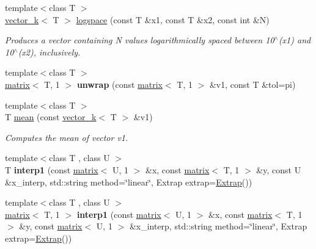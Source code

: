 \begin{DoxyCompactItemize}
\item 
{\footnotesize template$<$class T $>$ }\\\hyperlink{classkeycpp_1_1vector__k}{vector\-\_\-k}$<$ T $>$ \hyperlink{namespacekeycpp_a9e1c37fd71074c56e963be121e5de0f3}{logspace} (const T \&x1, const T \&x2, const int \&N)
\begin{DoxyCompactList}\small\item\em Produces a vector containing N values logarithmically spaced between 10$^\wedge$(x1) and 10$^\wedge$(x2), inclusively. \end{DoxyCompactList}\item 
\hypertarget{namespacekeycpp_ae471c1edede10cab9baaa3f97b79f9fe}{{\footnotesize template$<$class T $>$ }\\\hyperlink{classkeycpp_1_1matrix}{matrix}$<$ T, 1 $>$ {\bfseries unwrap} (const \hyperlink{classkeycpp_1_1matrix}{matrix}$<$ T, 1 $>$ \&v1, const T \&tol=pi)}\label{namespacekeycpp_ae471c1edede10cab9baaa3f97b79f9fe}

\item 
\hypertarget{namespacekeycpp_ae2909bfb67450be6a6d53a62752a2106}{{\footnotesize template$<$class T $>$ }\\T \hyperlink{namespacekeycpp_ae2909bfb67450be6a6d53a62752a2106}{mean} (const \hyperlink{classkeycpp_1_1vector__k}{vector\-\_\-k}$<$ T $>$ \&v1)}\label{namespacekeycpp_ae2909bfb67450be6a6d53a62752a2106}

\begin{DoxyCompactList}\small\item\em Computes the mean of vector v1. \end{DoxyCompactList}\item 
\hypertarget{namespacekeycpp_a69cb099fd0d2482617127385c7de7a06}{{\footnotesize template$<$class T , class U $>$ }\\T {\bfseries interp1} (const \hyperlink{classkeycpp_1_1matrix}{matrix}$<$ U, 1 $>$ \&x, const \hyperlink{classkeycpp_1_1matrix}{matrix}$<$ T, 1 $>$ \&y, const U \&x\-\_\-interp, std\-::string method=\char`\"{}linear\char`\"{}, Extrap extrap=\hyperlink{classkeycpp_1_1_extrap}{Extrap}())}\label{namespacekeycpp_a69cb099fd0d2482617127385c7de7a06}

\item 
\hypertarget{namespacekeycpp_a378d96774bbc4017e0bd39ccfed82e5d}{{\footnotesize template$<$class T , class U $>$ }\\\hyperlink{classkeycpp_1_1matrix}{matrix}$<$ T, 1 $>$ {\bfseries interp1} (const \hyperlink{classkeycpp_1_1matrix}{matrix}$<$ U, 1 $>$ \&x, const \hyperlink{classkeycpp_1_1matrix}{matrix}$<$ T, 1 $>$ \&y, const \hyperlink{classkeycpp_1_1matrix}{matrix}$<$ U, 1 $>$ \&x\-\_\-interp, std\-::string method=\char`\"{}linear\char`\"{}, Extrap extrap=\hyperlink{classkeycpp_1_1_extrap}{Extrap}())}\label{namespacekeycpp_a378d96774bbc4017e0bd39ccfed82e5d}


\end{DoxyCompactItemize}
